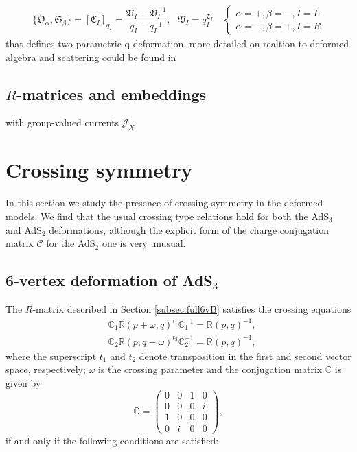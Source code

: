 \documentclass[12pt,a4paper]{article}
\makeatletter
\numberwithin{equation}{section}
\newcommand{\bbR}{\mathbb{R}}
\newcommand{\namedref}[2]{\hyperref[#2]{#1~\ref*{#2}}}
\newcommand{\secref}{\@ifstar{\namedref{Section}}{\namedref{Sec.}}}
\makeatother
\begin{document}
\begin{align*}
	\{ \mathfrak{O}_{\alpha}, \mathfrak{S}_{\beta} \} = \left[ \mathfrak{C}_{I} \right]_{q_{I}} =\dfrac{\mathfrak{V}_{I}-\mathfrak{V}_{I}^{-1}}{q_{I}-q_{I}^{-1}}, \text{   } \mathfrak{V}_{I} = q_{I}^{\mathfrak{C}_{I}} \quad 
	\begin{cases}
		\alpha = +, \beta = -, I = L \\
		\alpha = -, \beta = +, I = R
	\end{cases}
\end{align*}
that defines two-parametric q-deformation, more detailed on realtion to deformed algebra and scattering could be found in \secref{2-def SM}

\subsection{$ R $-matrices and embeddings}
\vspace{10mm}
with group-valued currents $ \mathcal{J}_{X} $

\fi

\section{Crossing symmetry}\label{crossing}

In this section we study the presence of crossing symmetry in the deformed models. We find that the usual crossing type relations hold for both the AdS$ _3 $ and AdS$ _2 $ deformations, although the explicit form of the charge conjugation matrix $ \mathcal{C} $ for the AdS$ _2 $ one is very unusual.

\subsection{6-vertex deformation of AdS$_3$}

The $ R $-matrix described in Section \ref{subsec:full6vB}  satisfies the crossing equations
%
\begin{align}
& \mathbb{C}_1\bbR(p+\omega,q)^{t_1}\mathbb{C}_1^{-1}=\bbR(p,q)^{-1},\nonumber\\
& \mathbb{C}_2\bbR(p,q-\omega)^{t_2}\mathbb{C}_2^{-1}=\bbR(p,q)^{-1},
\label{crossingeq}
\end{align}
%
where the superscript $ t_1 $ and $ t_2 $ denote transposition in the first and second vector space, respectively; $ \omega $ is the crossing parameter and the conjugation matrix $ \mathbb{C} $  is given by
%
\begin{equation}
\mathbb{C}=\begin{pmatrix}
0 & 0 & 1 & 0\\
0 & 0 & 0 & i\\
1 & 0 & 0 & 0\\
0 & i & 0 & 0
\end{pmatrix},
\label{crossingmatrix6vB}
\end{equation}
if and only if the following conditions are satisfied:
\end{document}
